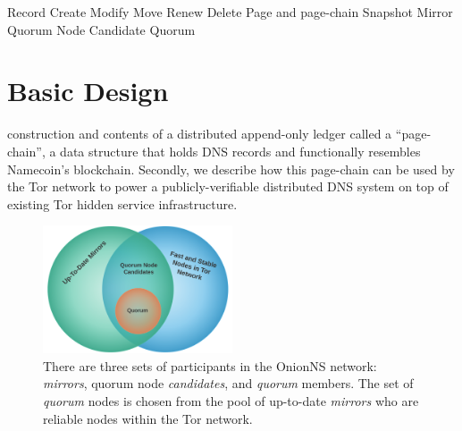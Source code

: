 Record
	Create
	Modify
	Move
	Renew
	Delete
Page and page-chain
Snapshot
Mirror
Quorum Node Candidate
Quorum



\section{Basic Design}

construction and contents of a distributed append-only ledger called a ``page-chain'', a data structure that holds DNS records and functionally resembles Namecoin's blockchain. Secondly, we describe how this page-chain can be used by the Tor network to power a publicly-verifiable distributed DNS system on top of existing Tor hidden service infrastructure.

\begin{figure}[htbp]
	\centering
	\includegraphics[width=0.5\textwidth]{images/LucidCharts/Participants.png}
	\caption{There are three sets of participants in the OnionNS network: \emph{mirrors}, quorum node \emph{candidates}, and \emph{quorum} members. The set of \emph{quorum} nodes is chosen from the pool of up-to-date \emph{mirrors} who are reliable nodes within the Tor network.}
\end{figure}

